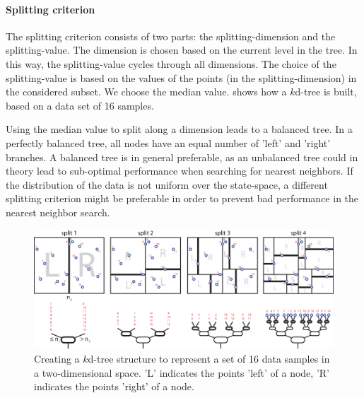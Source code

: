 \paragraph{Splitting criterion}
The splitting criterion consists of two parts: the splitting-dimension and the splitting-value. The dimension is chosen based on the current level in the tree. In this way, the splitting-value cycles through all dimensions. The choice of the splitting-value is based on the values of the points (in the splitting-dimension) in the considered subset. We choose the median value.  shows how a $k$d-tree is built, based on a data set of 16 samples.

Using the median value to split along a dimension leads to a balanced tree. In a perfectly balanced tree, all nodes have an equal number of 'left' and 'right' branches. A balanced tree is in general preferable, as an unbalanced tree could in theory lead to sub-optimal performance when searching for nearest neighbors. If the distribution of the data is not uniform over the state-space, a different splitting criterion might be preferable in order to prevent bad performance in the nearest neighbor search. 

\begin{figure}[htbp]
	\centering
		\includegraphics[width=\textwidth]{img/kdtree_buildv2}
	\caption[Construction of a $k$d-tree]{Creating a $k$d-tree structure to represent a set of 16 data samples in a two-dimensional space. 'L' indicates the points 'left' of a node, 'R' indicates the points 'right' of a node.}
	\label{fig:LLR-kdtree_build}
\end{figure}

